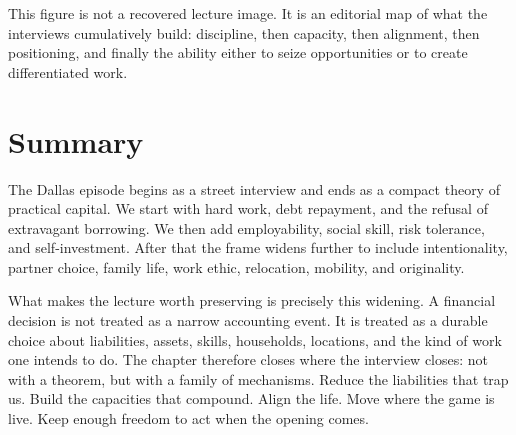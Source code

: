 \begin{figure}
\begin{center}
\end{center}
\end{figure}

This figure is not a recovered lecture image. It is an editorial map of what the interviews cumulatively build: discipline, then capacity, then alignment, then positioning, and finally the ability either to seize opportunities or to create differentiated work.

\section{Summary}

The Dallas episode begins as a street interview and ends as a compact theory of practical capital. We start with hard work, debt repayment, and the refusal of extravagant borrowing. We then add employability, social skill, risk tolerance, and self-investment. After that the frame widens further to include intentionality, partner choice, family life, work ethic, relocation, mobility, and originality.

What makes the lecture worth preserving is precisely this widening. A financial decision is not treated as a narrow accounting event. It is treated as a durable choice about liabilities, assets, skills, households, locations, and the kind of work one intends to do. The chapter therefore closes where the interview closes: not with a theorem, but with a family of mechanisms. Reduce the liabilities that trap us. Build the capacities that compound. Align the life. Move where the game is live. Keep enough freedom to act when the opening comes.
